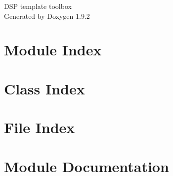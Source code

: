 \documentclass[twoside]{book}
\newcommand{\+}{\discretionary{\mbox{\scriptsize$\hookleftarrow$}}{}{}}
\newcommand{\clearemptydoublepage}{%
    \newpage{\pagestyle{empty}\cleardoublepage}%
  }
\begin{document}
  \raggedbottom
    \hypersetup{pageanchor=false,
                bookmarksnumbered=true,
                pdfencoding=unicode
               }
  \begin{titlepage}
  \vspace*{7cm}
  \begin{center}%
  {\Large DSP template toolbox}\\
  \vspace*{1cm}
  {\large Generated by Doxygen 1.9.2}\\
  \end{center}
  \end{titlepage}
  \clearemptydoublepage
  \tableofcontents
  \clearemptydoublepage
  \hypersetup{pageanchor=true}
\chapter{Module Index}

\chapter{Class Index}

\chapter{File Index}

\chapter{Module Documentation}











\end{document}
